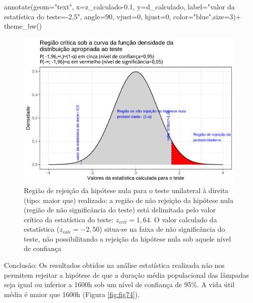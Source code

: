 \documentclass[
]{book}
\newenvironment{Shaded}{\begin{snugshade}}{\end{snugshade}}
\newcommand{\AttributeTok}[1]{\textcolor[rgb]{0.77,0.63,0.00}{#1}}
\newcommand{\DecValTok}[1]{\textcolor[rgb]{0.00,0.00,0.81}{#1}}
\newcommand{\FloatTok}[1]{\textcolor[rgb]{0.00,0.00,0.81}{#1}}
\newcommand{\FunctionTok}[1]{\textcolor[rgb]{0.00,0.00,0.00}{#1}}
\newcommand{\NormalTok}[1]{#1}
\newcommand{\SpecialCharTok}[1]{\textcolor[rgb]{0.00,0.00,0.00}{#1}}
\newcommand{\StringTok}[1]{\textcolor[rgb]{0.31,0.60,0.02}{#1}}
\begin{document}
\begin{Shaded}
\begin{Highlighting}[]
  \FunctionTok{annotate}\NormalTok{(}\AttributeTok{geom=}\StringTok{"text"}\NormalTok{, }\AttributeTok{x=}\NormalTok{z\_calculado}\FloatTok{{-}0.1}\NormalTok{, }\AttributeTok{y=}\NormalTok{d\_calculado, }\AttributeTok{label=}\StringTok{"valor da estatística do teste={-}2,5"}\NormalTok{, }\AttributeTok{angle=}\DecValTok{90}\NormalTok{, }\AttributeTok{vjust=}\DecValTok{0}\NormalTok{, }\AttributeTok{hjust=}\DecValTok{0}\NormalTok{, }\AttributeTok{color=}\StringTok{"blue"}\NormalTok{,}\AttributeTok{size=}\DecValTok{3}\NormalTok{)}\SpecialCharTok{+}
  \FunctionTok{theme\_bw}\NormalTok{()}
\end{Highlighting}
\end{Shaded}

\begin{figure}

{\centering \includegraphics[width=1\linewidth]{apostila_files/figure-latex/fig75-1} 

}

\caption{Região de rejeição da hipótese nula para o teste unilateral à direita (tipo: maior que) realizado: a região de não rejeição da hipótese nula (região de não significância do teste) está delimitada pelo valor crítico da estatística do teste: $z_{crit} = 1,64$. O valor calculado da estatística ($z_{calc}=-2,50$) situa-se na faixa de não significância do teste, não possibilitando a rejeição da hipótese nula sob aquele nível de confiança}\label{fig:fig75}
\end{figure}

\hfill\break

Conclusão: Os resultados obtidos na análise estatística realizada não nos permitem rejeitar a hipótese de que a duração média populacional das lâmpadas seja igual ou inferior a 1600h sob um nível de confiança de 95\%. A vida útil média é maior que 1600h (Figura \ref{fig:fig74}).
\end{document}
